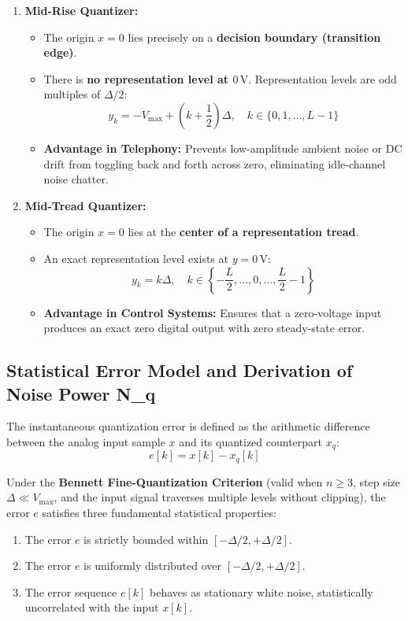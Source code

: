 \documentclass[11pt,a4paper]{article}
\begin{document}
\begin{enumerate}
    \item \textbf{Mid-Rise Quantizer:}
    \begin{itemize}
        \item The origin $x = 0$ lies precisely on a \textbf{decision boundary (transition edge)}.
        \item There is \textbf{no representation level at $0\,\mathrm{V}$}. Representation levels are odd multiples of $\Delta/2$:
        \begin{equation}
        y_k = -V_{\max} + \left(k + \frac{1}{2}\right)\Delta, \quad k \in \{0, 1, \dots, L-1\}
        \end{equation}
        \item \textbf{Advantage in Telephony:} Prevents low-amplitude ambient noise or DC drift from toggling back and forth across zero, eliminating idle-channel noise chatter.
    \end{itemize}
    
    \item \textbf{Mid-Tread Quantizer:}
    \begin{itemize}
        \item The origin $x = 0$ lies at the \textbf{center of a representation tread}.
        \item An exact representation level exists at $y = 0\,\mathrm{V}$:
        \begin{equation}
        y_k = k \Delta, \quad k \in \left\{-\frac{L}{2}, \dots, 0, \dots, \frac{L}{2}-1\right\}
        \end{equation}
        \item \textbf{Advantage in Control Systems:} Ensures that a zero-voltage input produces an exact zero digital output with zero steady-state error.
    \end{itemize}
\end{enumerate}

\subsection{Statistical Error Model and Derivation of Noise Power N\_q}
The instantaneous quantization error is defined as the arithmetic difference between the analog input sample $x$ and its quantized counterpart $x_q$:
\begin{equation}
e[k] = x[k] - x_q[k]
\end{equation}

Under the \textbf{Bennett Fine-Quantization Criterion} (valid when $n \ge 3$, step size $\Delta \ll V_{\max}$, and the input signal traverses multiple levels without clipping), the error $e$ satisfies three fundamental statistical properties:
\begin{enumerate}
    \item The error $e$ is strictly bounded within $[-\Delta/2, +\Delta/2]$.
    \item The error $e$ is uniformly distributed over $[-\Delta/2, +\Delta/2]$.
    \item The error sequence $e[k]$ behaves as stationary white noise, statistically uncorrelated with the input $x[k]$.
\end{enumerate}
\end{document}
